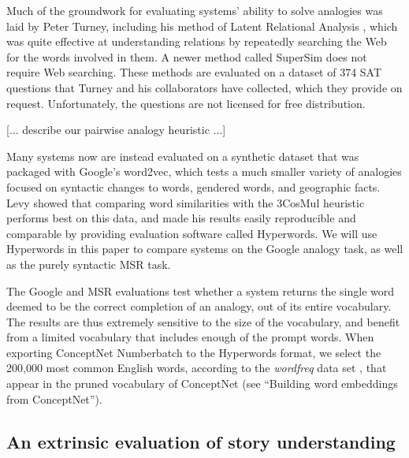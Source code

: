 \documentclass[letterpaper]{article}
\begin{document}
Much of the groundwork for evaluating systems' ability to solve analogies was
laid by Peter Turney, including his method of Latent Relational Analysis
\cite{turney2005lra}, which was quite effective at understanding
relations by repeatedly searching the Web for the words involved in them.
A newer method called SuperSim \cite{turney2013distributional} does not require
Web searching. These methods are evaluated on a dataset of 374 SAT questions
that Turney and his collaborators have collected, which they provide on request.
Unfortunately, the questions are not licensed for free distribution.

[... describe our pairwise analogy heuristic ...]

Many systems now are instead evaluated on a synthetic dataset that was packaged
with Google's word2vec, which tests a much smaller variety of analogies focused
on syntactic changes to words, gendered words, and geographic facts. Levy
showed that comparing word similarities with the 3CosMul heuristic
\cite{levy2015embeddings} performs best on this data, and made his results
easily reproducible and comparable by providing evaluation software called
Hyperwords. We will use Hyperwords in this paper to compare systems on the
Google analogy task, as well as the purely syntactic MSR task.

The Google and MSR evaluations test whether a system returns the single word
deemed to be the correct completion of an analogy, out of its entire
vocabulary. The results are thus extremely sensitive to the size of the
vocabulary, and benefit from a limited vocabulary that includes enough of the
prompt words. When exporting ConceptNet Numberbatch to the Hyperwords format,
we select the 200,000 most common English words, according to the
\emph{wordfreq} data set \cite{speer2016wordfreq}, that appear in the pruned
vocabulary of ConceptNet (see ``Building word embeddings from ConceptNet'').

\subsection{An extrinsic evaluation of story understanding}
\label{extrinsic-evaluation}


%
\end{document}
